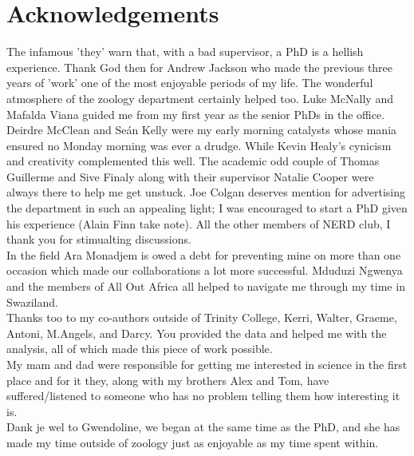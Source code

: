 \documentclass[twoside,12pt]{mythesis} %
\begin{document}
\chapter*{Acknowledgements}
The infamous 'they' warn that, with a bad supervisor, a PhD is a hellish experience. Thank God then for Andrew Jackson who made the previous three years of 'work' one of the most enjoyable periods of my life. The wonderful atmosphere of the zoology department certainly helped too. Luke McNally and Mafalda Viana guided me from my first year as the senior PhDs in the office. Deirdre McClean and Se{\'a}n Kelly were my early morning catalysts whose mania ensured no Monday morning was ever a drudge. While Kevin Healy's cynicism and creativity complemented this well. The academic odd couple of Thomas Guillerme and Sive Finaly along with their supervisor Natalie Cooper were always there to help me get unstuck. Joe Colgan deserves mention for advertising the department in such an appealing light; I was encouraged to start a PhD given his experience (Alain Finn take note). All the other members of NERD club, I thank you for stimualting discussions. \\
\indent
In the field Ara Monadjem is owed a debt for preventing mine on more than one occasion which made our collaborations a lot more successful. Mduduzi Ngwenya and the members of All Out Africa all helped to navigate me through my time in Swaziland. \\
\indent
Thanks too to my co-authors outside of Trinity College, Kerri, Walter, Graeme, Antoni, M.Angels, and Darcy. You provided the data and helped me with the analysis, all of which made this piece of work possible. \\
\indent
My mam and dad were responsible for getting me interested in science in the first place and for it they, along with my brothers Alex and Tom, have suffered/listened to someone who has no problem telling them how interesting it is. \\
\indent
Dank je wel to Gwendoline, we began at the same time as the PhD, and she has made my time outside of zoology just as enjoyable as my time spent within. 


\allcontents %
\cleardoublepage
\mainbody

\end{document}
